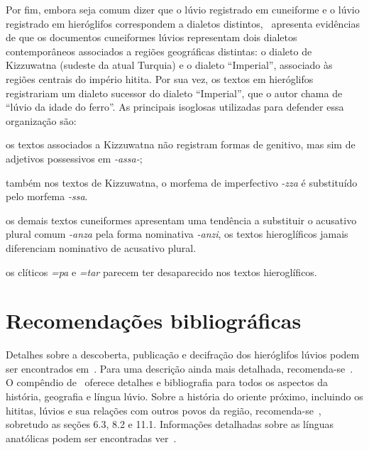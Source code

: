Por fim, embora seja comum dizer que o lúvio registrado em cuneiforme e o
lúvio registrado em hieróglifos correspondem a dialetos
distintos,~\citet{Yakubovich2010} apresenta evidências de que os
documentos cuneiformes lúvios representam dois dialetos contemporâneos
associados a regiões geográficas distintas: o dialeto de Kizzuwatna (sudeste da
atual Turquia) e o dialeto ``Imperial'', associado às regiões centrais do
império hitita.
Por sua vez, os textos em hieróglifos registrariam um dialeto sucessor do
dialeto ``Imperial'', que o autor chama de ``lúvio da idade do ferro''.
As principais isoglosas utilizadas para defender essa organização são:
\begin{inparaenum}
	\item os textos associados a Kizzuwatna não registram formas de genitivo, mas
	sim de adjetivos possessivos em \emph{-assa-};
	\item também nos textos de Kizzuwatna, o morfema de imperfectivo \emph{-zza}
	é substituído pelo morfema \emph{-ssa}.
	\item os demais textos cuneiformes apresentam uma tendência a substituir o
	acusativo plural comum \emph{-anza} pela forma nominativa \emph{-anzi},
	os textos hieroglíficos jamais diferenciam nominativo de acusativo plural.
	\item os clíticos \emph{=pa} e \emph{=tar} parecem ter desaparecido nos textos
	hieroglíficos.
\end{inparaenum}


\begin{center}
\end{center}

\section{Recomendações bibliográficas}

Detalhes sobre a descoberta, publicação e decifração dos hieróglifos lúvios
podem ser encontrados em~\citet[pp. 131ff.]{HawkinsScripts}. Para uma descrição
ainda mais detalhada, recomenda-se~\citet[pp. 6-17]{CHLI11}.
O compêndio de~\citet{Melchert2003} oferece detalhes e bibliografia para todos
os aspectos da história, geografia e língua lúvio.
Sobre a história do oriente próximo, incluindo os hititas, lúvios e sua
relações com outros povos da região, reco\-men\-da-se~\citet{Mieroop2015}, sobretudo
as seções 6.3, 8.2 e 11.1.
Informações detalhadas sobre as línguas anatólicas podem ser encontradas
ver~\citet{Yakubovich2010}.

